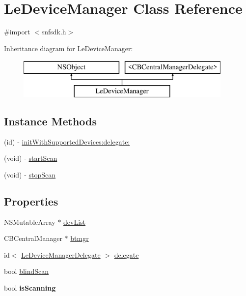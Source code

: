 \hypertarget{interface_le_device_manager}{}\section{Le\+Device\+Manager Class Reference}
\label{interface_le_device_manager}


{\ttfamily \#import $<$snfsdk.\+h$>$}

Inheritance diagram for Le\+Device\+Manager\+:\begin{figure}[H]
\begin{center}
\leavevmode
\includegraphics[height=2.000000cm]{interface_le_device_manager}
\end{center}
\end{figure}
\subsection*{Instance Methods}
\begin{DoxyCompactItemize}
\item 
(id) -\/ \hyperlink{interface_le_device_manager_a803f720122e8eb4f852c9b6fd0473b52}{init\+With\+Supported\+Devices\+:delegate\+:}
\item 
(void) -\/ \hyperlink{interface_le_device_manager_a53b10ce8eea270e388011903c30fa42f}{start\+Scan}
\item 
(void) -\/ \hyperlink{interface_le_device_manager_a09ec21757544ceaafdc4a20052b22c32}{stop\+Scan}
\end{DoxyCompactItemize}
\subsection*{Properties}
\begin{DoxyCompactItemize}
\item 
N\+S\+Mutable\+Array $\ast$ \hyperlink{interface_le_device_manager_a82f221588b5f9c8d9a9b823bcea56886}{dev\+List}
\item 
C\+B\+Central\+Manager $\ast$ \hyperlink{interface_le_device_manager_a6d2af12cf6c4f9473bd7bc4068770ddd}{btmgr}
\item 
id$<$ \hyperlink{protocol_le_device_manager_delegate-p}{Le\+Device\+Manager\+Delegate} $>$ \hyperlink{interface_le_device_manager_ac2ed7dcffc6d3fa1f1ab67cb6ed302f0}{delegate}
\item 
bool \hyperlink{interface_le_device_manager_a91fd6bfdd674498e4c10995eec97a609}{blind\+Scan}
\item 
\hypertarget{interface_le_device_manager_a7f1dd2e6e7e504aea5273b677ebf6335}{}bool {\bfseries is\+Scanning}\label{interface_le_device_manager_a7f1dd2e6e7e504aea5273b677ebf6335}

\end{DoxyCompactItemize}


